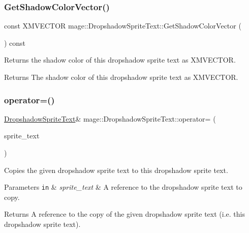 \subsubsection{\texorpdfstring{Get\+Shadow\+Color\+Vector()}{GetShadowColorVector()}}
{\footnotesize\ttfamily const X\+M\+V\+E\+C\+T\+OR mage\+::\+Dropshadow\+Sprite\+Text\+::\+Get\+Shadow\+Color\+Vector (\begin{DoxyParamCaption}{ }\end{DoxyParamCaption}) const\hspace{0.3cm}{\ttfamily [private]}}

Returns the shadow color of this dropshadow sprite text as {\ttfamily X\+M\+V\+E\+C\+T\+OR}.

\begin{DoxyReturn}{Returns}
The shadow color of this dropshadow sprite text as {\ttfamily X\+M\+V\+E\+C\+T\+OR}. 
\end{DoxyReturn}
\hypertarget{classmage_1_1_dropshadow_sprite_text_a83846227264396ee5b6ca44304bc404a}{}\label{classmage_1_1_dropshadow_sprite_text_a83846227264396ee5b6ca44304bc404a} 
\subsubsection{\texorpdfstring{operator=()}{operator=()}\hspace{0.1cm}{\footnotesize\ttfamily [1/2]}}
{\footnotesize\ttfamily \hyperlink{classmage_1_1_dropshadow_sprite_text}{Dropshadow\+Sprite\+Text}\& mage\+::\+Dropshadow\+Sprite\+Text\+::operator= (\begin{DoxyParamCaption}\item[{const \hyperlink{classmage_1_1_dropshadow_sprite_text}{Dropshadow\+Sprite\+Text} \&}]{sprite\+\_\+text }\end{DoxyParamCaption})\hspace{0.3cm}{\ttfamily [delete]}}

Copies the given dropshadow sprite text to this dropshadow sprite text.


\begin{DoxyParams}[1]{Parameters}
\mbox{\tt in}  & {\em sprite\+\_\+text} & A reference to the dropshadow sprite text to copy. \\
\hline
\end{DoxyParams}
\begin{DoxyReturn}{Returns}
A reference to the copy of the given dropshadow sprite text (i.\+e. this dropshadow sprite text). 
\end{DoxyReturn}
\hypertarget{classmage_1_1_dropshadow_sprite_text_aea70f005fd9eae94aee9da27aa54534b}{}\label{classmage_1_1_dropshadow_sprite_text_aea70f005fd9eae94aee9da27aa54534b} 
